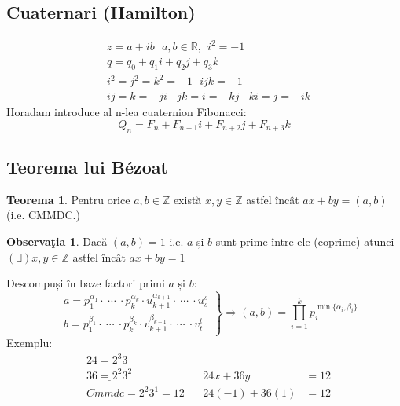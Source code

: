\documentclass[12pt]{article}
\theoremstyle{definition}
\newtheorem{teo}{Teorema}
\newtheorem{obs}{Observa\c tia}
\begin{document}
\subsection*{Cuaternari (Hamilton)}
\[\begin{aligned}
&z=a+ib\ \ \ a,b \in \mathbb{R},\ \ i^2=-1\\
&q=q_0+q_1i+q_2j+q_3k\\
&i^2 = j^2 = k^2 = -1\ \ \ ijk=-1\\
&ij = k =-ji\ \ \ \ jk=i=-kj \ \ \ \ ki=j=-ik 
\end{aligned}\]
Horadam introduce al n-lea cuaternion Fibonacci:
\[Q_n=F_n + F_{n+1}i + F_{n+2}j + F_{n+3}k\]
\subsection*{Teorema lui B\'{e}zoat}
\begin{teo}
Pentru orice $a,b \in \mathbb{Z}$ există $x,y\in \mathbb{Z}$ astfel încât $ax+by=(a,b)$ \\(i.e. CMMDC.)
\end{teo}
\begin{obs}
Dacă $(a,b) = 1$ i.e. $a$ și $b$ sunt prime între ele (coprime) atunci $(\exists) x,y \in \mathbb{Z}$ astfel încât $ax+by=1$   
\end{obs}
Descompuși în baze factori primi $a$ și $b$:
\[\left.\begin{aligned} 
&a = p^{\alpha_1}_1 \cdot\  \cdots\ \cdot p^{\alpha_k}_k \cdot u^{\alpha_{k+1}}_{k+1} \cdot \ \cdots \ \cdot u^{s}_{s}\\
&b = p^{\beta_1}_1 \cdot\  \cdots\ \cdot p^{\beta_k}_k \cdot v^{\beta_{k+1}}_{k+1} \cdot \ \cdots \ \cdot v^{t}_{t}
\end{aligned} \right\} \Rightarrow (a,b)=\prod_{i=1}^{k} p^{\min\{\alpha_i,\beta_i\}}_i
\]
Exemplu:
\[\begin{aligned}
&24 = 2^3 3 & \ \\
&\underline{36 = 2^2 3^2} &\  24x+36y&=12\\
&Cmmdc=2^2 3^1 = 12 \ \ \  &\  24(-1)+36(1)&=12
\end{aligned}\]
\end{document}
